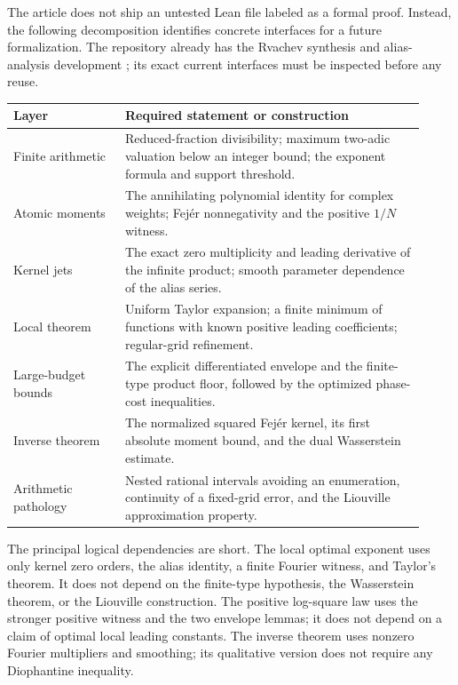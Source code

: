 \documentclass[11pt,a4paper]{article}
\numberwithin{equation}{section}
\theoremstyle{plain}
\theoremstyle{definition}
\theoremstyle{remark}
\begin{document}
The article does not ship an untested Lean file labeled as a formal proof.
Instead, the following decomposition identifies concrete interfaces for a
future formalization. The repository already has the Rvachev synthesis and
alias-analysis development \cite{repoFilters,repoFixed}; its exact current
interfaces must be inspected before any reuse.

\begin{center}
\small
\begin{tabular}{p{0.25\linewidth}p{0.67\linewidth}}
\toprule
Layer & Required statement or construction\\
\midrule
Finite arithmetic & Reduced-fraction divisibility; maximum two-adic valuation
below an integer bound; the exponent formula and support threshold.\\[4pt]
Atomic moments & The annihilating polynomial identity for complex weights;
Fej\'er nonnegativity and the positive $1/N$ witness.\\[4pt]
Kernel jets & The exact zero multiplicity and leading derivative of the
infinite product; smooth parameter dependence of the alias series.\\[4pt]
Local theorem & Uniform Taylor expansion; a finite minimum of functions with
known positive leading coefficients; regular-grid refinement.\\[4pt]
Large-budget bounds & The explicit differentiated envelope and the
finite-type product floor, followed by the optimized phase-cost inequalities.\\[4pt]
Inverse theorem & The normalized squared Fej\'er kernel, its first absolute
moment bound, and the dual Wasserstein estimate.\\[4pt]
Arithmetic pathology & Nested rational intervals avoiding an enumeration,
continuity of a fixed-grid error, and the Liouville approximation property.\\
\bottomrule
\end{tabular}
\end{center}

The principal logical dependencies are short. The local optimal exponent
uses only kernel zero orders, the alias identity, a finite Fourier witness,
and Taylor's theorem. It does not depend on the finite-type hypothesis, the
Wasserstein theorem, or the Liouville construction. The positive log-square
law uses the stronger positive witness and the two envelope lemmas; it does
not depend on a claim of optimal local leading constants. The inverse theorem
uses nonzero Fourier multipliers and smoothing; its qualitative version does
not require any Diophantine inequality.
\end{document}
